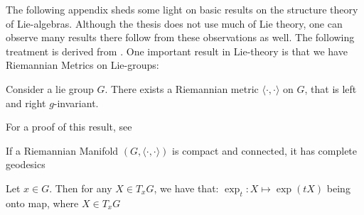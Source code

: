 
\newcommand{\Ad}{\operatorname{Ad}} %
\newcommand{\ad}{\operatorname{ad}} %

\noindent The following appendix sheds some light on basic results on the structure theory of Lie-algebras. Although the thesis does not use much of Lie theory, one can observe many results there follow from these observations as well. The following treatment is derived from \textcite{WangZuoqinLieGroups2013}. One important result in Lie-theory is that we have Riemannian Metrics on Lie-groups:

\begin{theorem}
\label{BiInvariantMetric}
Consider a lie group $G$. There exists a Riemannian metric $\langle \cdot, \cdot \rangle$ on $G$, that is left and right $g$-invariant. 
\end{theorem}

\begin{remark}
For a proof of this result, see \textcite{WangZuoqinLieGroups2013}
\end{remark}

\begin{theorem}
\label{CompleteGeodesics}
If a Riemannian Manifold $(G, \langle \cdot, \cdot \rangle)$ is compact and connected, it has complete geodesics\end{theorem}

\begin{remark}
Let $x \in G$. Then for any $X \in T_{x} G$, we have that: 
$\exp_{t}: X \mapsto \exp(tX)$ being onto map, where $X \in T_{x} G$ 
\end{remark}

